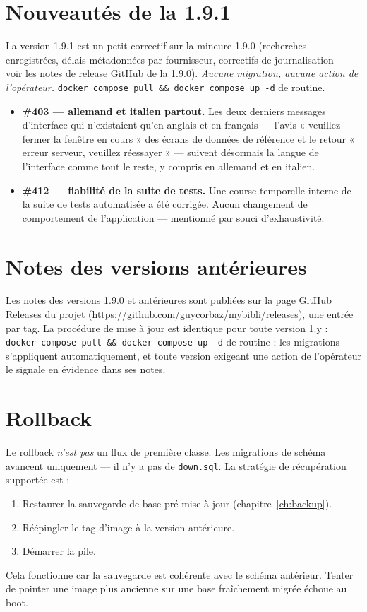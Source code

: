 \section{Nouveautés de la 1.9.1}\label{sec:whats-new-1.9.1}

La version 1.9.1 est un petit correctif sur la mineure 1.9.0
(recherches enregistrées, délais métadonnées par fournisseur,
correctifs de journalisation — voir les notes de release GitHub de la
1.9.0). \emph{Aucune migration, aucune action de l'opérateur.}
\texttt{docker compose pull \&\& docker compose up -d} de routine.

\begin{itemize}
  \item \textbf{\#403 \string— allemand et italien partout.} Les
        deux derniers messages d'interface qui n'existaient qu'en
        anglais et en français — l'avis « veuillez fermer la fenêtre
        en cours » des écrans de données de référence et le retour
        « erreur serveur, veuillez réessayer » — suivent désormais la
        langue de l'interface comme tout le reste, y compris en
        allemand et en italien.
  \item \textbf{\#412 \string— fiabilité de la suite de tests.}
        Une course temporelle interne de la suite de tests automatisée
        a été corrigée. Aucun changement de comportement de
        l'application \string— mentionné par souci d'exhaustivité.
\end{itemize}

\section{Notes des versions antérieures}

Les notes des versions 1.9.0 et antérieures sont publiées sur la page
GitHub Releases du projet
(\url{https://github.com/guycorbaz/mybibli/releases}), une entrée par
tag. La procédure de mise à jour est identique pour toute version 1.y :
\texttt{docker compose pull \&\& docker compose up -d} de routine ;
les migrations s'appliquent automatiquement, et toute version exigeant
une action de l'opérateur le signale en évidence dans ses notes.

\section{Rollback}

Le rollback \emph{n'est pas} un flux de première classe. Les
migrations de schéma avancent uniquement — il n'y a pas de
\texttt{down.sql}. La stratégie de récupération supportée est :

\begin{enumerate}
  \item Restaurer la sauvegarde de base pré-mise-à-jour
        (chapitre~\ref{ch:backup}).
  \item Réépingler le tag d'image à la version antérieure.
  \item Démarrer la pile.
\end{enumerate}

Cela fonctionne car la sauvegarde est cohérente avec le schéma
antérieur. Tenter de pointer une image plus ancienne sur une base
fraîchement migrée échoue au boot.
